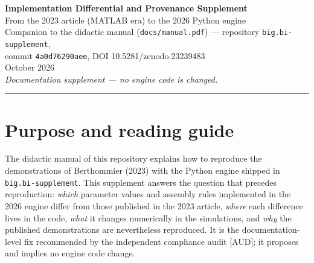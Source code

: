 \documentclass[11pt,letterpaper]{article}
\newcommand{\code}[1]{\texttt{#1}}
\begin{document}
\begin{center}
{\LARGE\bfseries Implementation Differential and Provenance Supplement}\\[5pt]
{\large From the 2023 article (MATLAB era) to the 2026 Python engine}\\[9pt]
{\small Companion to the didactic manual (\code{docs/manual.pdf}) --- repository
\code{big.bi-supplement},\\ commit \code{4a0d76290aee}, DOI 10.5281/zenodo.23239483}\\[4pt]
{\small October 2026}\\[3pt]
{\small\itshape Documentation supplement --- no engine code is changed.}
\end{center}
\vspace{2pt}
\noindent\rule{\textwidth}{0.6pt}
\vspace{4pt}

\tableofcontents
\vspace{6pt}

\section{Purpose and reading guide}

The didactic manual of this repository explains how to reproduce the
demonstrations of Berthommier (2023) with the Python engine shipped in
\code{big.bi-supplement}. This supplement answers the question that precedes
reproduction: \emph{which} parameter values and assembly rules implemented in
the 2026 engine differ from those published in the 2023 article, \emph{where}
each difference lives in the code, \emph{what} it changes numerically in the
simulations, and \emph{why} the published demonstrations are nevertheless
reproduced. It is the documentation-level fix recommended by the independent
compliance audit \hbox{[AUD]}; it proposes and implies no engine code change.
\end{document}
